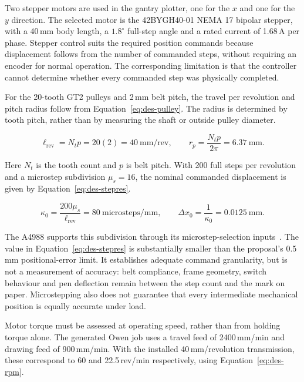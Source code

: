 Two stepper motors are used in the gantry plotter, one for the $x$ and one for the $y$ direction. The selected motor is the 42BYGH40-01 NEMA 17 bipolar stepper, with a 40\,mm body length, a $1.8^\circ$ full-step angle and a rated current of 1.68\,A per phase. Stepper control suits the required position commands because displacement follows from the number of commanded steps, without requiring an encoder for normal operation. The corresponding limitation is that the controller cannot determine whether every commanded step was physically completed.

For the 20-tooth GT2 pulleys and 2\,mm belt pitch, the travel per revolution and pitch radius follow from Equation~\ref{eq:des-pulley}. The radius is determined by tooth pitch, rather than by measuring the shaft or outside pulley diameter.

\begin{equation}
\ell_{\mathrm{rev}}=N_t p=20(2)=40\ \mathrm{mm/rev},\qquad
r_p=\frac{N_t p}{2\pi}=6.37\ \mathrm{mm}.
\label{eq:des-pulley}
\end{equation}

Here $N_t$ is the tooth count and $p$ is belt pitch. With 200 full steps per revolution and a microstep subdivision $\mu_s=16$, the nominal commanded displacement is given by Equation~\ref{eq:des-stepres}.

\begin{equation}
\kappa_0=\frac{200\mu_s}{\ell_{\mathrm{rev}}}=80\ \mathrm{microsteps/mm},\qquad
\Delta x_0=\frac{1}{\kappa_0}=0.0125\ \mathrm{mm}.
\label{eq:des-stepres}
\end{equation}

The A4988 supports this subdivision through its microstep-selection inputs~\cite[p.~6, Table~1]{a4988ds}. The value in Equation~\ref{eq:des-stepres} is substantially smaller than the proposal's 0.5\,mm positional-error limit. It establishes adequate command granularity, but is not a measurement of accuracy: belt compliance, frame geometry, switch behaviour and pen deflection remain between the step count and the mark on paper. Microstepping also does not guarantee that every intermediate mechanical position is equally accurate under load.

Motor torque must be assessed at operating speed, rather than from holding torque alone. The generated Owen job uses a travel feed of 2400\,mm/min and drawing feed of 900\,mm/min. With the installed 40\,mm/revolution transmission, these correspond to 60 and 22.5\,rev/min respectively, using Equation~\ref{eq:des-rpm}.


